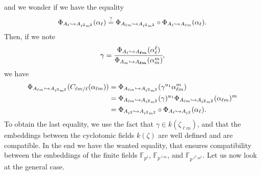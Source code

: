 \documentclass[a4paper,11pt]{article}
\begin{document}
and we wonder if we have the equality
\[
  \Phi_{A_{\ell}\hookrightarrow A_{\ell^2m^2}}(\alpha_\ell)\overset{?}{=}\Phi_{A_{\ell
  m}\hookrightarrow A_{\ell^2m^2}}\circ\Phi_{A_{\ell}\hookrightarrow A_{\ell m}}(\alpha_\ell).
\]
Then, if we note
\[
  \gamma = \cfrac{\Phi_{A_{\ell}\hookrightarrow A_{\bm{\ell
  m}}}(\alpha_{\ell}^{\ell})}{\Phi_{A_{m}\hookrightarrow A_{\bm{\ell
  m}}}(\alpha_{m}^{m})},
\]
we have
\begin{align*}
  \Phi_{A_{\ell m }\hookrightarrow A_{\ell^2m^2}}(C_{\ell m/\ell}(\alpha_{\ell m})) &=
  \Phi_{A_{\ell m}\hookrightarrow A_{\ell^2m^2}}(\gamma^{u_1}\alpha_{\ell m}^m)\\
  &= \Phi_{A_{\ell m}\hookrightarrow A_{\ell^2 m^2}}(\gamma)^{u_1}\Phi_{A_{\ell m}\hookrightarrow
  A_{\ell^2 m^2}}(\alpha_{\ell m})^{m}\\
  &= \Phi_{A_{\ell^2}\hookrightarrow A_{\ell^2m^2}}\circ\Phi_{A_{\ell}\hookrightarrow
  A_{\ell^2}}(\alpha_\ell).
\end{align*}
To obtain the last equality, we use the fact that $\gamma\in k(\zeta_{\ell m})$,
and that the embeddings between the cyclotomic fields $k(\zeta)$ are well
defined and are compatible. In the end we have the wanted equality, that ensures
compatibility between the embeddings of the finite fields $\mathbb{F}_{p^\ell}$,
$\mathbb{F}_{p^{\ell m}}$, and $\mathbb{F}_{p^{\ell^2m^2}}$. Let us now look at
the general case.
\end{document}
